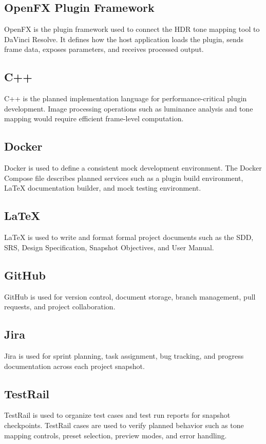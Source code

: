 \documentclass{article}
\begin{document}
\subsection{OpenFX Plugin Framework}
OpenFX is the plugin framework used to connect the HDR tone mapping tool to DaVinci Resolve. It defines how the host application loads the plugin, sends frame data, exposes parameters, and receives processed output.

\subsection{C++}
C++ is the planned implementation language for performance-critical plugin development. Image processing operations such as luminance analysis and tone mapping would require efficient frame-level computation.

\subsection{Docker}
Docker is used to define a consistent mock development environment. The Docker Compose file describes planned services such as a plugin build environment, LaTeX documentation builder, and mock testing environment.

\subsection{LaTeX}
LaTeX is used to write and format formal project documents such as the SDD, SRS, Design Specification, Snapshot Objectives, and User Manual.

\subsection{GitHub}
GitHub is used for version control, document storage, branch management, pull requests, and project collaboration.

\subsection{Jira}
Jira is used for sprint planning, task assignment, bug tracking, and progress documentation across each project snapshot.

\subsection{TestRail}
TestRail is used to organize test cases and test run reports for snapshot checkpoints. TestRail cases are used to verify planned behavior such as tone mapping controls, preset selection, preview modes, and error handling.
\end{document}
